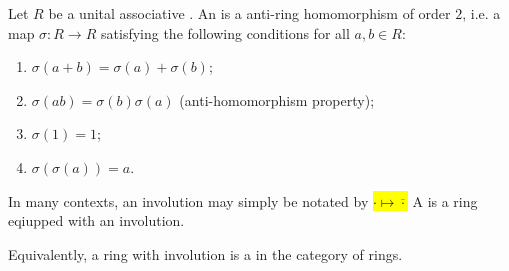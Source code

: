 \begin{definition} \label{definition:involution_on_a_ring}
Let $R$ be a unital associative . 
An  is a anti-ring homomorphism of order $2$, i.e. a map $\sigma: R \to R$ satisfying the following conditions for all $a, b \in R$:
\begin{enumerate}
    \item $\sigma(a+b) = \sigma(a) + \sigma(b)$;
    \item $\sigma(ab) = \sigma(b)\sigma(a)$ (anti-homomorphism property);
    \item $\sigma(1) = 1$;
    \item $\sigma(\sigma(a)) = a$.
\end{enumerate}
In many contexts, an involution may simply be notated by \hl{$\cdot \mapsto \overline{\cdot}$}
A  is a ring eqiupped with an involution.

Equivalently, a ring with involution is a  in the category of rings.
\end{definition}